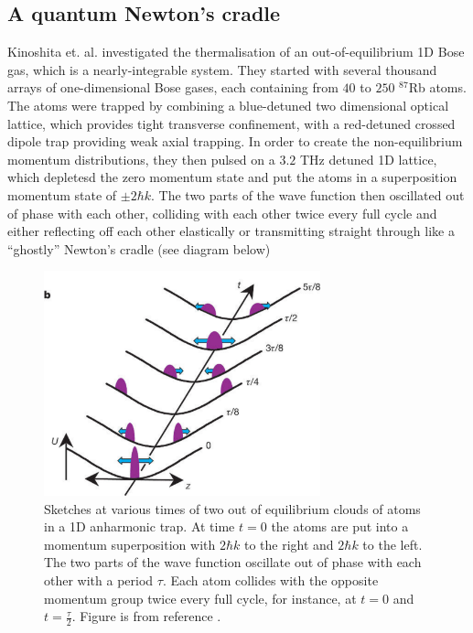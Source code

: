 \documentclass[a4paper,10pt]{article}
\theoremstyle{plain}
\begin{document}
\subsection{A quantum Newton's cradle}
Kinoshita et. al. investigated \cite{Kinoshita2006} the thermalisation of an out-of-equilibrium 1D Bose gas, which is a  nearly-integrable system. They started with
several thousand arrays of one-dimensional Bose gases, each containing from $40$ to $250$ $^{87}$Rb atoms. The atoms were trapped by combining a blue-detuned  two dimensional optical lattice, which provides tight transverse confinement, with a red-detuned crossed dipole trap 
providing weak axial trapping. In order to create the non-equilibrium momentum distributions, they then pulsed on a $3.2$ THz detuned 1D lattice, which depletesd the zero momentum state
and put the atoms in a superposition momentum state of $\pm2\hbar k$. The two parts of the wave function then oscillated out of phase with each other, colliding with each other twice every full cycle
and either reflecting off each other elastically or transmitting straight through like a ``ghostly'' Newton's cradle (see diagram below)

\begin{figure}[H]
 \begin{center}
 \includegraphics[width=8cm]{quantum_newtons_cradle}
 \end{center}
 \caption{Sketches at various times of two out of equilibrium
clouds of atoms in a 1D anharmonic trap. At time $t=0$ the atoms are put into a momentum superposition with $2\hbar k$ to the right and $2\hbar k$ to the left. The two parts of the
wave function oscillate out of phase with each other with a period $\tau$. Each atom collides with the opposite momentum group
twice every full cycle, for instance, at $t=0$ and $t=\frac{\tau}{2}$. Figure is from reference \cite{Kinoshita2006}.}
 \end{figure}
\end{document}
